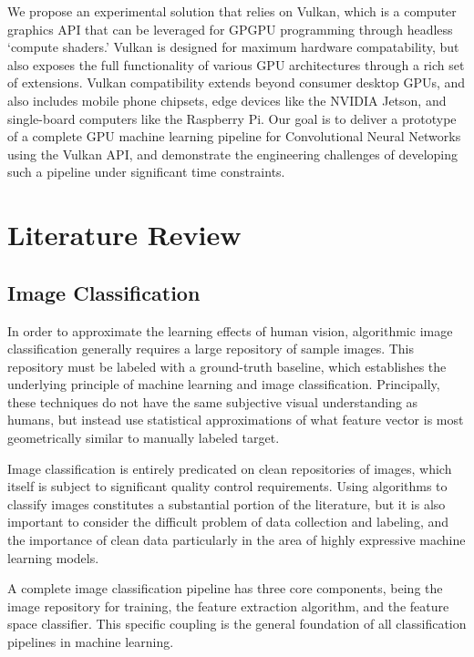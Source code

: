 \documentclass[10pt, a4paper]{article}
\begin{document}
We propose an experimental solution that relies on Vulkan, which is a computer graphics API that can be leveraged for GPGPU programming through headless `compute shaders.' Vulkan is designed for maximum hardware compatability, but also exposes the full functionality of various GPU architectures through a rich set of extensions\cite{khronos_group_vulkan_2026}. Vulkan compatibility extends beyond consumer desktop GPUs, and also includes mobile phone chipsets, edge devices like the NVIDIA Jetson, and single-board computers like the Raspberry Pi. Our goal is to deliver a prototype of a complete GPU machine learning pipeline for Convolutional Neural Networks using the Vulkan API, and demonstrate the engineering challenges of developing such a pipeline under significant time constraints. 

\section{Literature Review}

\subsection{Image Classification}
In order to approximate the learning effects of human vision, algorithmic image classification generally requires a large repository of sample images. This repository must be labeled with a ground-truth baseline, which establishes the underlying principle of machine learning and image classification. Principally, these techniques do not have the same subjective visual understanding as humans, but instead use statistical approximations of what feature vector is most geometrically similar to manually labeled target. 

Image classification is entirely predicated on clean repositories of images, which itself is subject to significant quality control requirements. Using algorithms to classify images constitutes a substantial portion of the literature, but it is also important to consider the difficult problem of data collection and labeling, and the importance of clean data particularly in the area of highly expressive machine learning models.

A complete image classification pipeline has three core components, being the image repository for training, the feature extraction algorithm, and the feature space classifier. This specific coupling is the general foundation of all classification pipelines in machine learning. 
\end{document}
